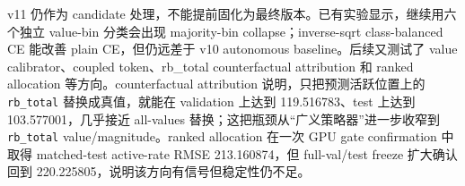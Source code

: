 \documentclass[UTF8,a4paper,11pt]{ctexart}
\newcommand{\code}[1]{\texttt{#1}}
\begin{document}
\begin{table}[H]
\centering
\small
{}
\caption{v10 policy bridge 与半 oracle 诊断，来源为 \code{pi\_jwm\_v10\_policy\_bridge\_*\_gpu\_20260620}。}
\end{table}

v11 仍作为 candidate 处理，不能提前固化为最终版本。已有实验显示，继续用六个独立 value-bin 分类会出现 majority-bin collapse；inverse-sqrt class-balanced CE 能改善 plain CE，但仍远差于 v10 autonomous baseline。后续又测试了 value calibrator、coupled token、rb\_total counterfactual attribution 和 ranked allocation 等方向。counterfactual attribution 说明，只把预测活跃位置上的 \code{rb\_total} 替换成真值，就能在 validation 上达到 119.516783、test 上达到 103.577001，几乎接近 all-values 替换；这把瓶颈从“广义策略器”进一步收窄到 \code{rb\_total} value/magnitude。ranked allocation 在一次 GPU gate confirmation 中取得 matched-test active-rate RMSE 213.160874，但 full-val/test freeze 扩大确认回到 220.225805，说明该方向有信号但稳定性仍不足。
\end{document}
